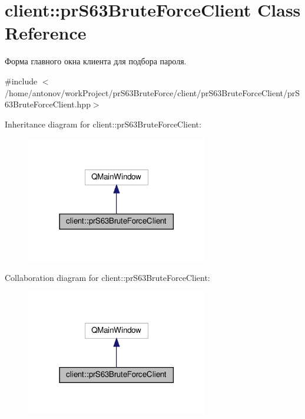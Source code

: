 \hypertarget{classclient_1_1pr_s63_brute_force_client}{}\section{client\+:\+:pr\+S63\+Brute\+Force\+Client Class Reference}
\label{classclient_1_1pr_s63_brute_force_client}


Форма главного окна клиента для подбора пароля.  




{\ttfamily \#include $<$/home/antonov/work\+Project/pr\+S63\+Brute\+Force/client/pr\+S63\+Brute\+Force\+Client/pr\+S63\+Brute\+Force\+Client.\+hpp$>$}



Inheritance diagram for client\+:\+:pr\+S63\+Brute\+Force\+Client\+:\nopagebreak
\begin{figure}[H]
\begin{center}
\leavevmode
\includegraphics[width=225pt]{classclient_1_1pr_s63_brute_force_client__inherit__graph}
\end{center}
\end{figure}


Collaboration diagram for client\+:\+:pr\+S63\+Brute\+Force\+Client\+:\nopagebreak
\begin{figure}[H]
\begin{center}
\leavevmode
\includegraphics[width=225pt]{classclient_1_1pr_s63_brute_force_client__coll__graph}
\end{center}
\end{figure}
